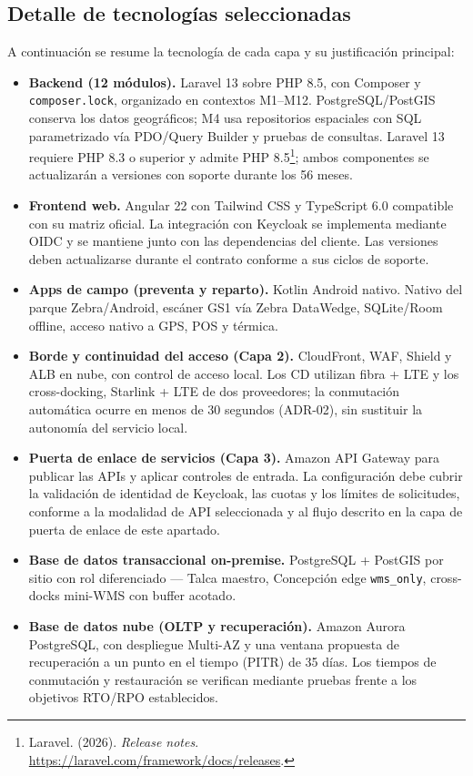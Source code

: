 \subsection{Detalle de tecnologías seleccionadas}

A continuación se resume la tecnología de cada capa y su justificación principal:

\begin{itemize}
  \item \textbf{Backend (12 módulos).} Laravel 13 sobre PHP 8.5, con Composer y \texttt{composer.lock}, organizado en contextos M1--M12. PostgreSQL/PostGIS conserva los datos geográficos; M4 usa repositorios espaciales con SQL parametrizado vía PDO/Query Builder y pruebas de consultas. Laravel 13 requiere PHP 8.3 o superior y admite PHP 8.5\footnote{Laravel. (2026). \emph{Release notes}. \url{https://laravel.com/framework/docs/releases}.}; ambos componentes se actualizarán a versiones con soporte durante los 56 meses.
  \item \textbf{Frontend web.} Angular 22 con Tailwind CSS y TypeScript 6.0 compatible con su matriz oficial. La integración con Keycloak se implementa mediante OIDC y se mantiene junto con las dependencias del cliente. Las versiones deben actualizarse durante el contrato conforme a sus ciclos de soporte.
  \item \textbf{Apps de campo (preventa y reparto).} Kotlin Android nativo. Nativo del parque Zebra/Android, escáner GS1 vía Zebra DataWedge, SQLite/Room offline, acceso nativo a GPS, POS y térmica.
  \item \textbf{Borde y continuidad del acceso (Capa 2).} CloudFront, WAF, Shield y ALB en nube, con control de acceso local. Los CD utilizan fibra + LTE y los cross-docking, Starlink + LTE de dos proveedores; la conmutación automática ocurre en menos de 30 segundos (ADR-02), sin sustituir la autonomía del servicio local.
  \item \textbf{Puerta de enlace de servicios (Capa 3).} Amazon API Gateway para publicar las APIs y aplicar controles de entrada. La configuración debe cubrir la validación de identidad de Keycloak, las cuotas y los límites de solicitudes, conforme a la modalidad de API seleccionada y al flujo descrito en la capa de puerta de enlace de este apartado.
  \item \textbf{Base de datos transaccional on-premise.} PostgreSQL + PostGIS por sitio con rol diferenciado --- Talca maestro, Concepción edge \texttt{wms\_only}, cross-docks mini-WMS con buffer acotado.
  \item \textbf{Base de datos nube (OLTP y recuperación).} Amazon Aurora PostgreSQL, con despliegue Multi-AZ y una ventana propuesta de recuperación a un punto en el tiempo (PITR) de 35 días. Los tiempos de conmutación y restauración se verifican mediante pruebas frente a los objetivos RTO/RPO establecidos.

\end{itemize}
